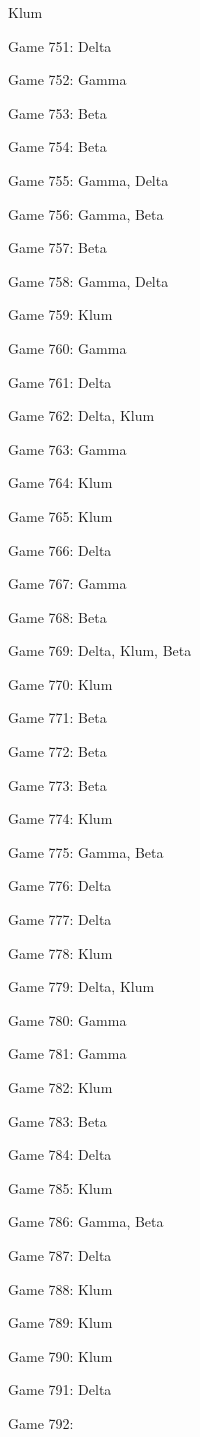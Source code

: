 \documentclass{article}
\begin{document}
\begin{multicols}{3}
\begin{compactitem}
Klum
\item Game 751:
Delta
\item Game 752:
Gamma
\item Game 753:
Beta
\item Game 754:
Beta
\item Game 755:
Gamma, Delta
\item Game 756:
Gamma, Beta
\item Game 757:
Beta
\item Game 758:
Gamma, Delta
\item Game 759:
Klum
\item Game 760:
Gamma
\item Game 761:
Delta
\item Game 762:
Delta, Klum
\item Game 763:
Gamma
\item Game 764:
Klum
\item Game 765:
Klum
\item Game 766:
Delta
\item Game 767:
Gamma
\item Game 768:
Beta
\item Game 769:
Delta, Klum, Beta
\item Game 770:
Klum
\item Game 771:
Beta
\item Game 772:
Beta
\item Game 773:
Beta
\item Game 774:
Klum
\item Game 775:
Gamma, Beta
\item Game 776:
Delta
\item Game 777:
Delta
\item Game 778:
Klum
\item Game 779:
Delta, Klum
\item Game 780:
Gamma
\item Game 781:
Gamma
\item Game 782:
Klum
\item Game 783:
Beta
\item Game 784:
Delta
\item Game 785:
Klum
\item Game 786:
Gamma, Beta
\item Game 787:
Delta
\item Game 788:
Klum
\item Game 789:
Klum
\item Game 790:
Klum
\item Game 791:
Delta
\item Game 792:

\end{compactitem}
\end{multicols}
\end{document}
